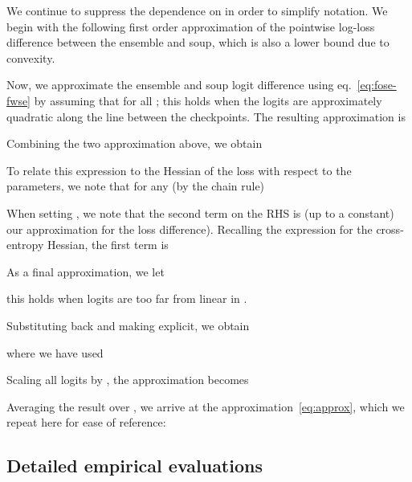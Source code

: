 We continue to suppress the dependence on  in order to simplify notation.
We begin with the following first order approximation of the pointwise log-loss difference between the ensemble and soup, which is also a lower bound due to convexity. 


Now, we approximate the ensemble and soup logit difference using eq.~\ref{eq:fose-fwse} by assuming that  for all ; this holds when the logits are approximately quadratic along the line between the checkpoints. The resulting approximation is


Combining the two approximation above, we obtain


To relate this expression to the Hessian of the loss with respect to the parameters, we note that for any  (by the chain rule)
 
When setting , we note that the second term on the RHS is (up to a constant) our approximation for the loss difference). Recalling the expression for the cross-entropy Hessian, the first term is


As a final approximation, we let

this holds when logits are too far from linear in . 

Substituting back and making  explicit, we obtain

where we have used


Scaling all logits by , the approximation becomes

Averaging the result over , we arrive at the approximation~\eqref{eq:approx}, which we repeat here for ease of reference:


\subsection{Detailed empirical evaluations}\label{app:theory-eval}


